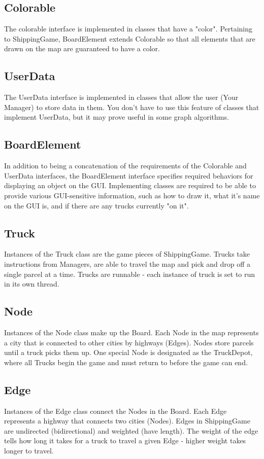 \documentclass[11pt]{article}
\begin{document}
\subsection{Colorable}
The colorable interface is implemented in classes that have a "color". Pertaining to ShippingGame, BoardElement extends Colorable so that all elements that are drawn on the map are guaranteed to have a color.
\subsection{UserData}
The UserData interface is implemented in classes that allow the user (Your Manager) to store data in them. You don't have to use this feature of classes that implement UserData, but it may prove useful in some graph algorithms.
\subsection{BoardElement}
In addition to being a concatenation of the requirements of the Colorable and UserData interfaces, the BoardElement interface specifies required behaviors for displaying an object on the GUI. Implementing classes are required to be able to provide various GUI-sensitive information, such as how to draw it, what it's name on the GUI is, and if there are any trucks currently "on it".
\subsection{Truck}
Instances of the Truck class are the game pieces of ShippingGame. Trucks take instructions from Managers, are able to travel the map and pick and drop off a single parcel at a time. Trucks are runnable - each instance of truck is set to run in its own thread.
\subsection{Node}
Instances of the Node class make up the Board. Each Node in the map represents a city that is connected to other cities by highways (Edges). Nodes store parcels until a truck picks them up. One special Node is designated as the TruckDepot, where all Trucks begin the game and must return to before the game can end.
\subsection{Edge}
Instances of the Edge class connect the Nodes in the Board. Each Edge represents a highway that connects two cities (Nodes). Edges in ShippingGame are undirected (bidirectional) and weighted (have length). The weight of the edge tells how long it takes for a truck to travel a given Edge - higher weight takes longer to travel.
\end{document}
